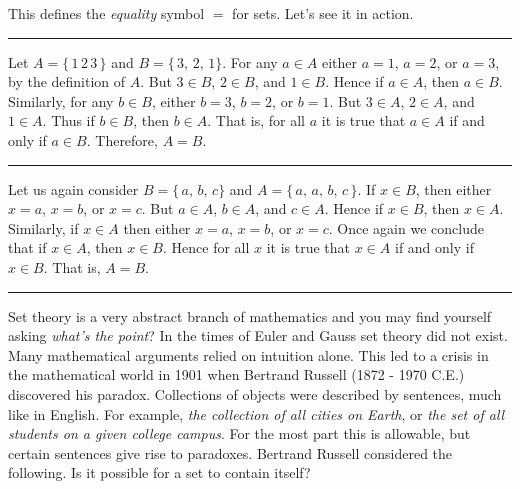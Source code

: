         This defines the \textit{equality} symbol $=$ for sets. Let's see it in
        action.
        \par\hfill\par\hrule
        \begin{example}
            Let $A=\{\,1\,2\,3\,\}$ and $B=\{\,3,\,2,\,1\}$. For any $a\in{A}$
            either $a=1$, $a=2$, or $a=3$, by the definition of $A$. But
            $3\in{B}$, $2\in{B}$, and $1\in{B}$. Hence if $a\in{A}$, then
            $a\in{B}$. Similarly, for any $b\in{B}$, either $b=3$, $b=2$, or
            $b=1$. But $3\in{A}$, $2\in{A}$, and $1\in{A}$. Thus if $b\in{B}$,
            then $b\in{A}$. That is, for all $a$ it is true that $a\in{A}$ if
            and only if $a\in{B}$. Therefore, $A=B$.
        \end{example}
        \hrule
        \begin{example}
            Let us again consider $B=\{\,a,\,b,\,c\}$ and
            $A=\{\,a,\,a,\,b,\,c\,\}$. If $x\in{B}$, then either
            $x=a$, $x=b$, or $x=c$. But $a\in{A}$, $b\in{A}$, and $c\in{A}$.
            Hence if $x\in{B}$, then $x\in{A}$. Similarly, if $x\in{A}$ then
            either $x=a$, $x=b$, or $x=c$. Once again we conclude that if
            $x\in{A}$, then $x\in{B}$. Hence for all $x$ it is true that
            $x\in{A}$ if and only if $x\in{B}$. That is, $A=B$.
        \end{example}
        \hrule\par\hfill\par
        Set theory is a very abstract branch of mathematics and you may find
        yourself asking \textit{what's the point}? In the times of Euler and
        Gauss set theory did not exist. Many mathematical arguments relied on
        intuition alone. This led to a crisis in the mathematical world in
        1901 when Bertrand Russell (1872 - 1970 C.E.) discovered his paradox.
        Collections of objects were described by sentences, much like in
        English. For example, \textit{the collection of all cities on Earth},
        or \textit{the set of all students on a given college campus}. For the
        most part this is allowable, but certain sentences give rise to
        paradoxes. Bertrand Russell considered the following.
        \textrm{Is it possible for a set to contain itself?}
